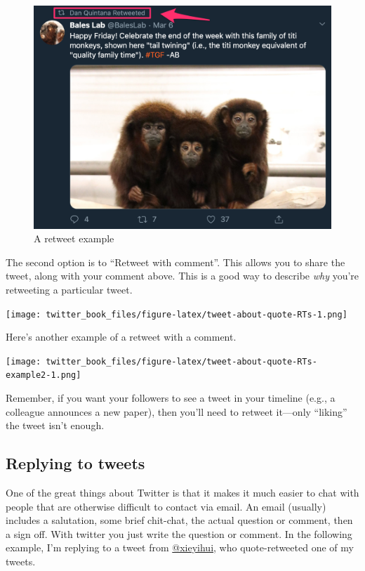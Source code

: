\documentclass[
]{book}
\begin{document}
\begin{figure}

\includegraphics[width=0.8\linewidth]{images/retweet} \hfill{}

\caption{A retweet example}\label{fig:unnamed-chunk-8}
\end{figure}

The second option is to ``Retweet with comment''. This allows you to share the tweet, along with your comment above. This is a good way to describe \emph{why} you're retweeting a particular tweet.

\texttt{[image: twitter\_book\_files/figure-latex/tweet-about-quote-RTs-1.png]}

Here's another example of a retweet with a comment.

\texttt{[image: twitter\_book\_files/figure-latex/tweet-about-quote-RTs-example2-1.png]}

Remember, if you want your followers to see a tweet in your timeline (e.g., a colleague announces a new paper), then you'll need to retweet it---only ``liking'' the tweet isn't enough.

\hypertarget{replying-to-tweets}{%
\subsection{Replying to tweets}\label{replying-to-tweets}}

One of the great things about Twitter is that it makes it much easier to chat with people that are otherwise difficult to contact via email. An email (usually) includes a salutation, some brief chit-chat, the actual question or comment, then a sign off. With twitter you just write the question or comment. In the following example, I'm replying to a tweet from \href{https://twitter.com/xieyihui}{@xieyihui}, who quote-retweeted one of my tweets.
\end{document}
